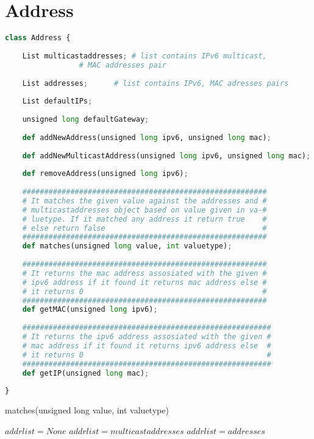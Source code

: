 \documentclass[10pt,a4paper,titlepage]{report}
\begin{document}
\lstset{style=mystyle}

\section{Address}
\begin{lstlisting}[language=Python]
class Address {
	
	List multicastaddresses; # list contains IPv6 multicast, 
				 # MAC addresses pair
	
	List addresses;		 # list contains IPv6, MAC adresses pairs
	
	List defaultIPs;
	
	unsigned long defaultGateway;
	
	def addNewAddress(unsigned long ipv6, unsigned long mac);
	
	def addNewMulticastAddress(unsigned long ipv6, unsigned long mac);
	
	def removeAddress(unsigned long ipv6);
	
	########################################################
	# It matches the given value against the addresses and #
	# multicastaddresses object based on value given in va-#
	# luetype. If it matched any address it return true    #
	# else return false                                    #
	########################################################
	def matches(unsigned long value, int valuetype);
	
	########################################################
	# It returns the mac address assosiated with the given #
	# ipv6 address if it found it returns mac address else #
	# it returns 0                                         #
	########################################################
	def getMAC(unsigned long ipv6);
	
	#########################################################
	# It returns the ipv6 address assosiated with the given #
	# mac address if it found it returns ipv6 address else  #
	# it returns 0                                          #
	#########################################################
	def getIP(unsigned long mac);
	
}
\end{lstlisting}

\begin{algorithm}
	\caption{matches(unsigned long value, int valuetype)}
	\begin{algorithmic}[1]
		\STATE $addrlist = None$
			\STATE $addrlist = multicastaddresses$
		\ELSE
			\STATE $addrlist = addresses$
		\ENDIF
				\RETURN \TRUE
			\ENDIF
		\ENDFOR
		\RETURN \FALSE
	\end{algorithmic}
\end{algorithm}
\end{document}
